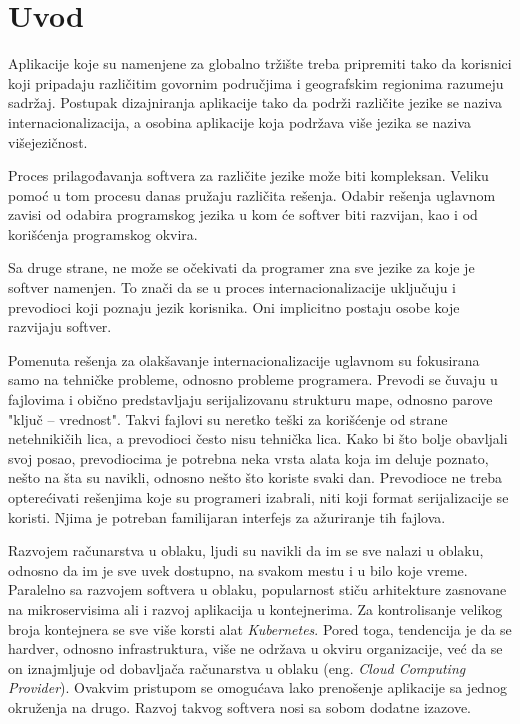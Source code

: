 \chapter{Uvod}\label{ch:uvod}

Aplikacije koje su namenjene za globalno tržište treba pripremiti 
tako da korisnici koji pripadaju različitim govornim područjima i 
geografskim regionima razumeju sadržaj. Postupak dizajniranja aplikacije 
tako da podrži različite jezike se naziva internacionalizacija, a osobina 
aplikacije koja podržava više jezika se naziva višejezičnost. 

Proces prilagođavanja softvera za različite jezike može biti kompleksan. 
Veliku pomoć u tom procesu danas pružaju različita rešenja. Odabir rešenja 
uglavnom zavisi od odabira programskog jezika u kom će softver biti 
razvijan, kao i od korišćenja programskog okvira.

Sa druge strane, ne može se očekivati da programer zna sve jezike za koje je 
softver namenjen. To znači da se u proces internacionalizacije uključuju i 
prevodioci koji poznaju jezik korisnika. Oni implicitno 
postaju osobe koje razvijaju softver.

Pomenuta rešenja za olakšavanje internacionalizacije uglavnom su fokusirana
samo na tehničke probleme, odnosno probleme programera. Prevodi se čuvaju u
fajlovima i obično predstavljaju serijalizovanu strukturu mape, odnosno parove
"ključ -- vrednost". Takvi fajlovi su neretko teški za korišćenje od strane
netehnikičih lica, a prevodioci često nisu tehnička lica. Kako bi što bolje 
obavljali svoj posao, prevodiocima je potrebna neka vrsta alata koja im deluje
poznato, nešto na šta su navikli, odnosno nešto što koriste svaki dan. 
Prevodioce ne treba opterećivati rešenjima koje su programeri izabrali, niti koji format 
serijalizacije se koristi. Njima je potreban familijaran interfejs za ažuriranje
tih fajlova.

Razvojem računarstva u oblaku, ljudi su navikli da im se sve nalazi u oblaku, 
odnosno da im je sve uvek dostupno, na svakom mestu i u bilo koje vreme. 
Paralelno sa razvojem softvera u oblaku, popularnost stiču arhitekture zasnovane
na mikroservisima ali i razvoj aplikacija u kontejnerima. Za kontrolisanje 
velikog broja kontejnera se sve više korsti alat \textit{Kubernetes}. Pored toga, 
tendencija je da se hardver, odnosno infrastruktura, više ne održava u okviru
organizacije, već da se on iznajmljuje od dobavljača računarstva u oblaku 
(eng. \textit{Cloud Computing Provider}). Ovakvim pristupom se omogućava lako 
prenošenje aplikacije sa jednog okruženja na drugo. Razvoj takvog softvera nosi
sa sobom dodatne izazove. 

